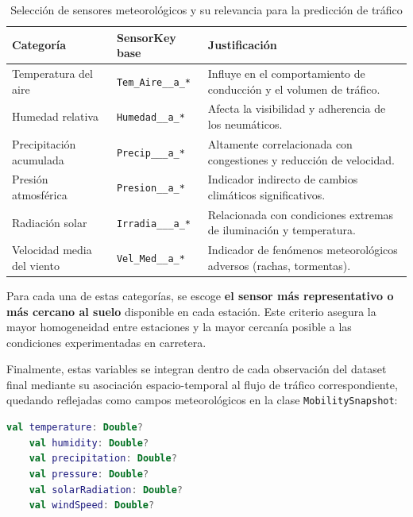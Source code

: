 \begin{table}[H]
	\centering
	\caption{Selección de sensores meteorológicos y su relevancia para la predicción de tráfico}
	\label{tab:seleccion_meteo}
	\begin{tabular}{|l|l|p{7cm}|}
		\hline
		\textbf{Categoría} & \textbf{SensorKey base} & \textbf{Justificación} \\ \hline
		Temperatura del aire    & \texttt{Tem\_Aire\_\_a\_*}  & Influye en el comportamiento de conducción y el volumen de tráfico. \\ \hline
		Humedad relativa         & \texttt{Humedad\_\_a\_*}   & Afecta la visibilidad y adherencia de los neumáticos. \\ \hline
		Precipitación acumulada  & \texttt{Precip\_\_\_a\_*}  & Altamente correlacionada con congestiones y reducción de velocidad. \\ \hline
		Presión atmosférica      & \texttt{Presion\_\_a\_*}   & Indicador indirecto de cambios climáticos significativos. \\ \hline
		Radiación solar          & \texttt{Irradia\_\_\_a\_*} & Relacionada con condiciones extremas de iluminación y temperatura. \\ \hline
		Velocidad media del viento & \texttt{Vel\_Med\_\_a\_*}  & Indicador de fenómenos meteorológicos adversos (rachas, tormentas). \\ \hline
	\end{tabular}
\end{table}

\vspace{1em}
Para cada una de estas categorías, se escoge \textbf{el sensor más representativo o más cercano al suelo} disponible en cada estación. Este criterio asegura la mayor homogeneidad entre estaciones y la mayor cercanía posible a las condiciones experimentadas en carretera.

Finalmente, estas variables se integran dentro de cada observación del dataset final mediante su asociación espacio-temporal al flujo de tráfico correspondiente, quedando reflejadas como campos meteorológicos en la clase \texttt{MobilitySnapshot}:

\begin{lstlisting}[language=Kotlin, caption={Variables meteorológicas integradas en MobilitySnapshot}]
	val temperature: Double?
	val humidity: Double?
	val precipitation: Double?
	val pressure: Double?
	val solarRadiation: Double?
	val windSpeed: Double?
\end{lstlisting}

